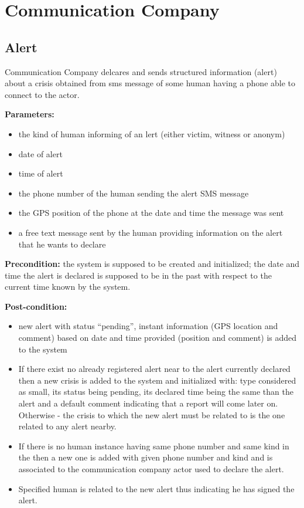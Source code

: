 \section{Communication Company}

\subsection{Alert}

Communication Company delcares and sends structured information (alert) about a
crisis obtained from sms message of some human having a phone able to connect to the
actor.

\begin{description}

\item \textbf{Parameters:} 
\begin{itemize}
  \item the kind of human informing of an lert (either victim, witness or
  anonym)
  \item date of alert
  \item time of alert
  \item the phone number of the human sending the alert SMS message
  \item the GPS position of the phone at the date and time the message was sent
  \item a free text message sent by the human providing information on the alert
  that he wants to declare
\end{itemize}
\item \textbf{Precondition:} the system is supposed to be created and
initialized; the date and time the alert is declared is supposed to be in the
past with respect to the current time known by the system.
\item \textbf{Post-condition:} 
\begin{itemize}
	\item new alert with status ``pending'', instant
information (GPS location and comment) based on date and time provided
(position and comment) is added to the system 
	\item If there exist no already registered alert near to the alert currently
	declared then a new crisis is added to the system and initialized with: type
	considered as small, its status being pending, its declared time being the
	same than the alert and a default comment indicating that a report will come
	later on. Otherwise - the crisis to which the new alert must be related to is
	the one related to any alert nearby.
	\item If there is no human instance having same phone number and same kind in
	the then a new one is added with given phone number and kind and is associated
	to the communication company actor used to declare the alert.
	\item Specified human is related to the new alert thus indicating he has
	signed the alert.
\end{itemize}
 

\end{description}
